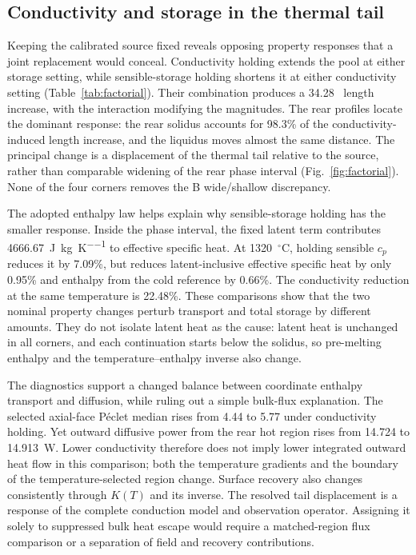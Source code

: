 \subsection{Conductivity and storage in the thermal tail}
Keeping the calibrated source fixed reveals opposing property responses that a joint replacement would conceal. Conductivity holding extends the pool at either storage setting, while sensible-storage holding shortens it at either conductivity setting (Table~\ref{tab:factorial}). Their combination produces a 34.28~\um{} length increase, with the interaction modifying the magnitudes. The rear profiles locate the dominant response: the rear solidus accounts for 98.3\% of the conductivity-induced length increase, and the liquidus moves almost the same distance. The principal change is a displacement of the thermal tail relative to the source, rather than comparable widening of the rear phase interval (Fig.~\ref{fig:factorial}). None of the four corners removes the B wide/shallow discrepancy.

The adopted enthalpy law helps explain why sensible-storage holding has the smaller response. Inside the phase interval, the fixed latent term contributes 4666.67~\si{\joule\per\kilogram\per\kelvin} to effective specific heat. At 1320~$^\circ$C, holding sensible $c_p$ reduces it by 7.09\%, but reduces latent-inclusive effective specific heat by only 0.95\% and enthalpy from the cold reference by 0.66\%. The conductivity reduction at the same temperature is 22.48\%. These comparisons show that the two nominal property changes perturb transport and total storage by different amounts. They do not isolate latent heat as the cause: latent heat is unchanged in all corners, and each continuation starts below the solidus, so pre-melting enthalpy and the temperature--enthalpy inverse also change.

The diagnostics support a changed balance between coordinate enthalpy transport and diffusion, while ruling out a simple bulk-flux explanation. The selected axial-face P\'eclet median rises from 4.44 to 5.77 under conductivity holding. Yet outward diffusive power from the rear hot region rises from 14.724 to 14.913~W. Lower conductivity therefore does not imply lower integrated outward heat flow in this comparison; both the temperature gradients and the boundary of the temperature-selected region change. Surface recovery also changes consistently through $K(T)$ and its inverse. The resolved tail displacement is a response of the complete conduction model and observation operator. Assigning it solely to suppressed bulk heat escape would require a matched-region flux comparison or a separation of field and recovery contributions.

